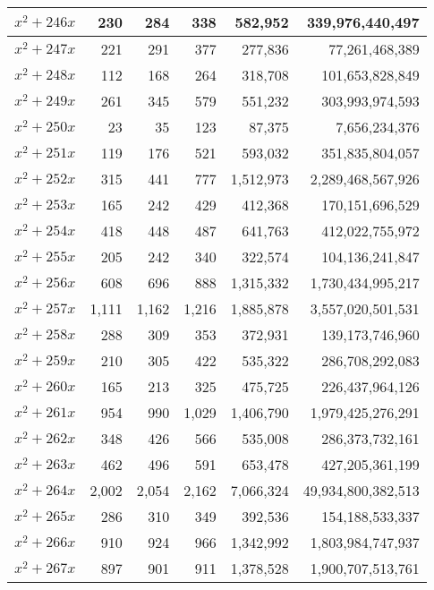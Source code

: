 \documentclass[a4paper]{amsproc}
\theoremstyle{plain}
\theoremstyle{named}
\begin{document}
\begin{longtable}{ | l | r | r | r | r | r | }
$x^2 + 246x$ & 230 & 284 & 338 & 582{,}952 & 339{,}976{,}440{,}497 \\ \hline
$x^2 + 247x$ & 221 & 291 & 377 & 277{,}836 & 77{,}261{,}468{,}389 \\ \hline
$x^2 + 248x$ & 112 & 168 & 264 & 318{,}708 & 101{,}653{,}828{,}849 \\ \hline
$x^2 + 249x$ & 261 & 345 & 579 & 551{,}232 & 303{,}993{,}974{,}593 \\ \hline
$x^2 + 250x$ & 23 & 35 & 123 & 87{,}375 & 7{,}656{,}234{,}376 \\ \hline
$x^2 + 251x$ & 119 & 176 & 521 & 593{,}032 & 351{,}835{,}804{,}057 \\ \hline
$x^2 + 252x$ & 315 & 441 & 777 & 1{,}512{,}973 & 2{,}289{,}468{,}567{,}926 \\ \hline
$x^2 + 253x$ & 165 & 242 & 429 & 412{,}368 & 170{,}151{,}696{,}529 \\ \hline
$x^2 + 254x$ & 418 & 448 & 487 & 641{,}763 & 412{,}022{,}755{,}972 \\ \hline
$x^2 + 255x$ & 205 & 242 & 340 & 322{,}574 & 104{,}136{,}241{,}847 \\ \hline
$x^2 + 256x$ & 608 & 696 & 888 & 1{,}315{,}332 & 1{,}730{,}434{,}995{,}217 \\ \hline
$x^2 + 257x$ & 1{,}111 & 1{,}162 & 1{,}216 & 1{,}885{,}878 & 3{,}557{,}020{,}501{,}531 \\ \hline
$x^2 + 258x$ & 288 & 309 & 353 & 372{,}931 & 139{,}173{,}746{,}960 \\ \hline
$x^2 + 259x$ & 210 & 305 & 422 & 535{,}322 & 286{,}708{,}292{,}083 \\ \hline
$x^2 + 260x$ & 165 & 213 & 325 & 475{,}725 & 226{,}437{,}964{,}126 \\ \hline
$x^2 + 261x$ & 954 & 990 & 1{,}029 & 1{,}406{,}790 & 1{,}979{,}425{,}276{,}291 \\ \hline
$x^2 + 262x$ & 348 & 426 & 566 & 535{,}008 & 286{,}373{,}732{,}161 \\ \hline
$x^2 + 263x$ & 462 & 496 & 591 & 653{,}478 & 427{,}205{,}361{,}199 \\ \hline
$x^2 + 264x$ & 2{,}002 & 2{,}054 & 2{,}162 & 7{,}066{,}324 & 49{,}934{,}800{,}382{,}513 \\ \hline
$x^2 + 265x$ & 286 & 310 & 349 & 392{,}536 & 154{,}188{,}533{,}337 \\ \hline
$x^2 + 266x$ & 910 & 924 & 966 & 1{,}342{,}992 & 1{,}803{,}984{,}747{,}937 \\ \hline
$x^2 + 267x$ & 897 & 901 & 911 & 1{,}378{,}528 & 1{,}900{,}707{,}513{,}761 \\ \hline

\end{longtable}
\end{document}
